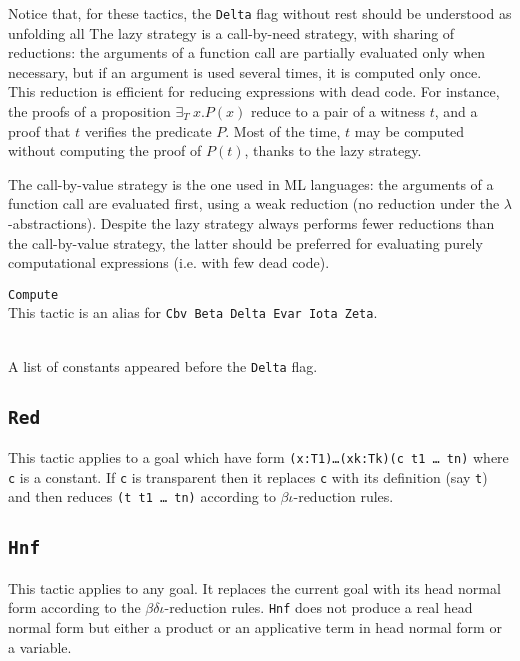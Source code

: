 Notice that, for these tactics, the {\tt Delta} flag without rest should be understood as unfolding all
The lazy strategy is a call-by-need strategy, with sharing of
reductions: the arguments of a function call are partially evaluated
only when necessary, but if an argument is used several times, it is
computed only once. This reduction is efficient for reducing
expressions with dead code. For instance, the proofs of a proposition
$\exists_T ~x. P(x)$ reduce to a pair of a witness $t$, and a proof
that $t$ verifies the predicate $P$. Most of the time, $t$ may be
computed without computing the proof of $P(t)$, thanks to the lazy
strategy.

The call-by-value strategy is the one used in ML languages: the
arguments of a function call are evaluated first, using a weak
reduction (no reduction under the $\lambda$-abstractions). Despite the
lazy strategy always performs fewer reductions than the call-by-value
strategy, the latter should be preferred for evaluating purely
computational expressions (i.e. with few dead code).

\begin{Variants}
\item {\tt Compute}\\
  This tactic is an alias for {\tt Cbv Beta Delta Evar Iota Zeta}.
\end{Variants}

\begin{ErrMsgs}
\item {}\\
  A list of constants appeared before the {\tt Delta} flag.
\end{ErrMsgs}


\subsection{{\tt Red}}
This tactic applies to a goal which have form {\tt (x:T1)\dots(xk:Tk)(c
  t1 \dots\ tn)} where {\tt c} is a constant.  If {\tt c} is transparent
then it replaces {\tt c} with its definition (say {\tt t}) and then
reduces {\tt (t t1 \dots\ tn)} according to $\beta\iota$-reduction rules.

\begin{ErrMsgs}
\item {}
\end{ErrMsgs}

\subsection{{\tt Hnf}}
This tactic applies to any goal. It replaces the current goal with its
head normal form according to the $\beta\delta\iota$-reduction
rules. {\tt Hnf} does not produce a real head normal form but either a
product or an applicative term in head normal form or a variable.

